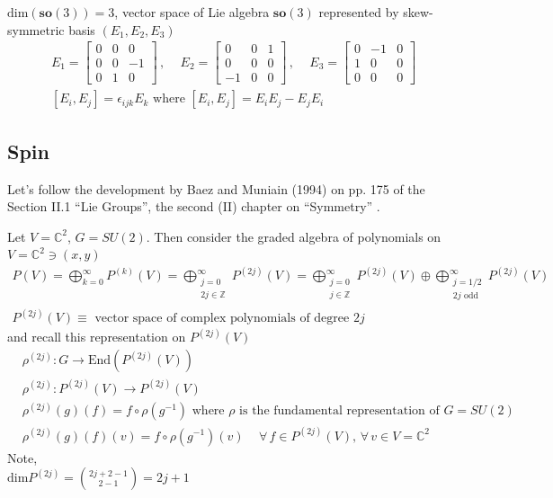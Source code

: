 $\text{dim}(\mathbf{so}(3)) = 3$, vector space of Lie algebra $\mathbf{so}(3)$ represented by skew-symmetric basis $(E_1, E_2, E_3)$
\[
\begin{gathered}
E_1 = \left[ \begin{matrix} 0 & 0 & 0 \\ 0 & 0 & -1 \\ 0 & 1 & 0 \end{matrix} \right] \, , \quad \, E_2 = \left[ \begin{matrix} 0 & 0 & 1 \\ 0 & 0 & 0 \\ -1 & 0 & 0 \end{matrix} \right] \, , \quad \, E_3 = \left[ \begin{matrix} 0 & -1 & 0 \\ 1 & 0 & 0 \\ 0 & 0 & 0 \end{matrix} \right] \\
[E_i , E_j ] =\epsilon_{ijk}E_k \text{ where } [E_i, E_j ] = E_i E_j - E_j E_i
\end{gathered} 
\]



\subsection{Spin}

Let's follow the development by Baez and Muniain (1994) on pp. 175 of the Section II.1 ``Lie Groups'', the second (II) chapter on ``Symmetry'' \cite{dgdt:JBaezJMuniain1994}.  

Let $V = \mathbb{C}^2$, $G=SU(2)$.  Then consider the graded algebra of polynomials on $V = \mathbb{C}^2 \ni (x,y)$
\[
\begin{gathered}
P(V) = \bigoplus_{k=0}^{\infty} P^{(k)}(V) = \bigoplus_{ \substack{ j =0 \\ 2j \in \mathbb{Z}} }^{\infty} P^{(2j)}(V) = \bigoplus_{ \substack{ j=0 \\ j\in \mathbb{Z} }}^{\infty} P^{(2j)}(V) \oplus \bigoplus_{ \substack{ j=1/2 \\ 2j \text{ odd } } }^{\infty} P^{(2j)}(V) \\
P^{(2j)}(V) \equiv \text{ vector space of complex polynomials of degree $2j$ }
\end{gathered}
\]
and recall this representation on $P^{(2j)}(V)$
\[
\begin{aligned}
& \rho^{(2j)}:G \to \text{End}(P^{(2j)}(V)) \\ 
& \rho^{(2j)}: P^{(2j)}(V) \to P^{(2j)}(V) \\ 
& \rho^{(2j)}(g)(f) = f\circ \rho(g^{-1}) \text{ where $\rho$ is the fundamental representation of $G=SU(2)$ }\\
& \rho^{(2j)}(g)(f)(v) = f\circ \rho(g^{-1})(v) \quad \, \forall \, f \in P^{(2j)}(V), \, \forall \, v \in V = \mathbb{C}^2
\end{aligned}
\]
Note, \\
$\text{dim}P^{(2j)} = \binom{2j+2-1 }{2-1} = 2j+1$

